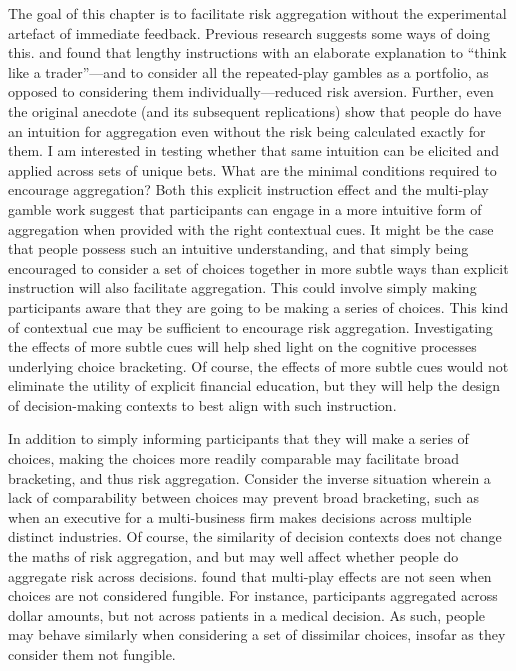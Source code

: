 \documentclass[a4paper, nobind, dvipsnames]{templates/ociamthesis}
\theoremstyle{definition}
\theoremstyle{definition}
\theoremstyle{definition}
\theoremstyle{definition}
\theoremstyle{remark}
\begin{document}
The goal of this chapter is to facilitate risk aggregation without the
experimental artefact of immediate feedback. Previous research suggests some
ways of doing this. \textcite{sokolhessner2009} and \textcite{sokolhessner2012} found that lengthy
instructions with an elaborate explanation to ``think like a trader''---and to
consider all the repeated-play gambles as a portfolio, as opposed to considering
them individually---reduced risk aversion. Further, even the original
\textcite{samuelson1963} anecdote (and its subsequent replications) show that people do
have an intuition for aggregation even without the risk being calculated exactly
for them. I am interested in testing whether that same intuition can be elicited
and applied across sets of unique bets. What are the minimal conditions required
to encourage aggregation? Both this explicit instruction effect and the
multi-play gamble work suggest that participants can engage in a more intuitive
form of aggregation when provided with the right contextual cues. It might be
the case that people possess such an intuitive understanding, and that simply
being encouraged to consider a set of choices together in more subtle ways than
explicit instruction will also facilitate aggregation. This could involve simply
making participants aware that they are going to be making a series of choices.
This kind of contextual cue may be sufficient to encourage risk aggregation.
Investigating the effects of more subtle cues will help shed light on the
cognitive processes underlying choice bracketing. Of course, the effects of more
subtle cues would not eliminate the utility of explicit financial education, but
they will help the design of decision-making contexts to best align with such
instruction.

In addition to simply informing participants that they will make a series of
choices, making the choices more readily comparable may facilitate broad
bracketing, and thus risk aggregation. Consider the inverse situation wherein a
lack of comparability between choices may prevent broad bracketing, such as when
an executive for a multi-business firm makes decisions across multiple distinct
industries. Of course, the similarity of decision contexts does not change the
maths of risk aggregation, and but may well affect whether people do aggregate
risk across decisions. \textcite{dekay2005} found that multi-play effects are not seen
when choices are not considered fungible. For instance, participants aggregated
across dollar amounts, but not across patients in a medical decision. As such,
people may behave similarly when considering a set of dissimilar choices,
insofar as they consider them not fungible.
\end{document}
